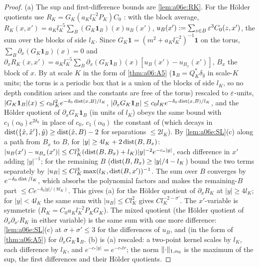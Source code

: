 \begin{proof}
(a) The sup and first-difference bounds are \cref{lem:a06e:RK}. For the H\"older quotients use $R_K=G_K(a_Kl_K^{-2}P_K)C_0$ \cite[(1.25)]{Ba3}: with the block average, $R_K(x,x')=a_Kl_K^{-5}\sum_B(G_K\mathbf 1_B)(x)u_B(x')$, $u_B(x'):=\sum_{z\in B}\varepsilon^3C_0(z,x')$, the sum over the blocks of side $l_K$. Since $G_K\mathbf 1=(m^2+a_Kl_K^{-2})^{-1}\mathbf 1$ on the torus, $\sum_B\partial_x(G_K\mathbf 1_B)(x)=0$ and $\partial_xR_K(x,x')=a_Kl_K^{-5}\sum_B\partial_x(G_K\mathbf 1_B)(x)[u_B(x')-u_{B_x}(x')]$, $B_x$ the block of $x$. By \cite[Lemma~2.4, (2.35)--(2.36)]{Ba4} at scale $K$ in the form of \cref{thm:a06:A5} ($\mathbf 1_B=Q_K^*\delta_{\hat y}$ in scale-$K$ units; the torus is a periodic box that is a union of the blocks of side $l_K$, so no depth condition arises and the constants are free of the torus) rescaled to $\varepsilon$-units, $|G_K\mathbf 1_B|(x)\le c_0l_K^2e^{-\delta_0\operatorname{dist}(x,B)/l_K}$, $|\partial_xG_K\mathbf 1_B|\le c_0l_Ke^{-\delta_0\operatorname{dist}(x,B)/l_K}$, and the H\"older quotient of $\partial_xG_K\mathbf 1_B$ (in units of $l_K$) obeys the same bound with $c_1(\alpha_0)e^{2\delta_0}$ in place of $c_0$, $c_1(\alpha_0)$ the constant of \cite[(2.36)]{Ba4} (which decays in $\operatorname{dist}(\{\hat x,\hat x'\},\hat y)\ge\operatorname{dist}(\hat x,B)-2$ for separations $\le2l_K$). By \cref{lem:a06e:SL}(c) along a path from $B_x$ to $B$, for $|y|\ge4l_K+2\operatorname{dist}(B,B_x)$: $|u_B(x')-u_{B_x}(x')|\le Cl_K^3(\operatorname{dist}(B,B_x)+l_K)|y|^{-2}e^{-c_*|y|}$, each difference in $x'$ adding $|y|^{-1}$; for the remaining $B$ ($\operatorname{dist}(B,B_x)\ge|y|/4-l_K$) bound the two terms separately by $|u_B|\le Cl_K^3\max(l_K,\operatorname{dist}(B,x'))^{-1}$. The sum over $B$ converges by $e^{-\delta_0\operatorname{dist}/l_K}$, which absorbs the polynomial factors and makes the remaining-$B$ part $\le Ce^{-\delta_0|y|/(8l_K)}$. This gives (a) for the H\"older quotient of $\partial_xR_K$ at $|y|\ge4l_K$; for $|y|<4l_K$ the same sum with $|u_B|\le Cl_K^2$ gives $Cl_K^{-2-\sigma'}$. The $x'$-variable is symmetric ($R_K=C_0a_Kl_K^{-2}P_KG_K$). The mixed quotient (the H\"older quotient of $\partial_x\partial_{x'}R_K$ in either variable) is the same sum with one more difference: \cref{lem:a06e:SL}(c) at $\sigma+\sigma'\le3$ for the differences of $u_B$, and \cite[(2.36)]{Ba4} (in the form of \cref{thm:a06:A5}) for $\partial_xG_K\mathbf 1_B$. (b) is (a) rescaled: a two-point kernel scales by $l_K$, each difference by $l_K$, and $e^{-c_*|y|}=e^{-c_*tr}$; the norm $\lVert \cdot\rVert_{1,\alpha_0}$ is the maximum of the sup, the first differences and their H\"older quotients.
\end{proof}

